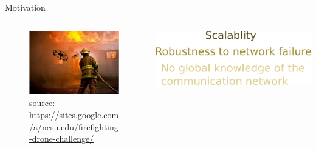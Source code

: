 \documentclass{beamer}
\theoremstyle{remark}
\begin{document}
\begin{frame}{Motivation}
\begin{center}
\end{center}
\begin{columns}
	\begin{column}{.33\textwidth}
		\begin{figure}
			\centering
			\includegraphics[width=1\linewidth]{ff_drones.jpg}
			\caption*{\tiny source: \href{https://sites.google.com/a/ncsu.edu/firefighting-drone-challenge/}{\tiny https://sites.google.com/a/ncsu.edu/firefighting-drone-challenge/}}
			\label{fig:diffusion}
		\end{figure}
	\end{column}
	
	\begin{column}{.33\textwidth}
		\includegraphics[width=1\linewidth]{objective.png}
%
	\end{column}	
	

\end{columns}
\end{frame}
\end{document}
